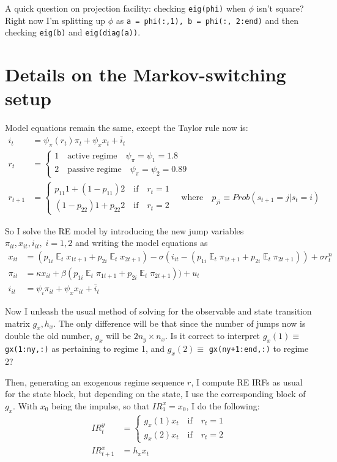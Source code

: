 \documentclass[11pt]{article}
\renewcommand{\[}{\begin{equation}}
\renewcommand{\]}{\end{equation}}
\DeclareMathOperator{\E}{\mathbb{E}}
\begin{document}
A quick question on projection facility: checking \texttt{eig(phi)} when $\phi$ isn't square? \\
Right now I'm splitting up $\phi$ as \texttt{a = phi(:,1), b = phi(:, 2:end)} and then checking \texttt{eig(b)} and \texttt{eig(diag(a))}.

\section{Details on the Markov-switching setup}
Model equations remain the same, except the Taylor rule now is:
\begin{align}
i_t & = \psi_{\pi}(r_t) \pi_t + \psi_x x_t + \bar{i}_t \\
r_t & = \begin{cases} 1 \quad \text{active regime} \quad  \psi_{\pi} = \psi_1 = 1.8  \\  2 \quad \text{passive regime} \quad  \psi_{\pi} = \psi_2= 0.89 \end{cases} \\
r_{t+1} &= \begin{cases} p_{11} 1 + (1-p_{11}) 2 \quad \text{if} \quad r_t = 1\\ (1-p_{22}) 1 + p_{22} 2 \quad \text{if} \quad r_t = 2\end{cases} \quad \text{where} \quad p_{ji}\equiv Prob(s_{t+1}=j | s_t = i)
\end{align}

So I solve the RE model by introducing the new jump variables $\pi_{it}, x_{it}, i_{it}, \; i =1,2$ and writing the model equations as
\begin{align}
x_{it} &=  (p_{1i}\E_t x_{1t+1} +p_{2i}\E_t x_{2t+1})  - \sigma(i_{it} - (p_{1i}\E_t \pi_{1t+1} +p_{2i}\E_t \pi_{2t+1})) +\sigma r_t^n   \\
\pi_{it} &= \kappa x_{it} +\beta (p_{1i}\E_t \pi_{1t+1} +p_{2i}\E_t \pi_{2t+1})) + u_t   \\
i_{it} &= \psi_{i}\pi_{it} + \psi_{x} x_{it}  + \bar{i}_t \label{TR}
\end{align}

Now I unleash the usual method of solving for the observable and state transition matrix $g_x, h_x$. The only difference will be that since the number of jumps now is double the old number, $g_x$ will be $2n_y \times n_x$. Is it correct to interpret $g_{x}(1) \equiv$ \texttt{gx(1:ny,:)} as pertaining to regime 1, and $g_{x}(2) \equiv$ \texttt{gx(ny+1:end,:)} to regime 2?

Then, generating an exogenous regime sequence $r$, I compute RE IRFs as usual for the state block, but depending on the state, I use the corresponding block of $g_x$. With $x_0$ being the impulse, so that $IR^x_1 = x_0$, I do the following:
\begin{align}
IR^y_t & = \begin{cases} g_{x}(1) x_t \quad \text{if} \quad r_t =1 \\ g_{x}(2) x_t \quad \text{if} \quad r_t =2 \end{cases} \\
IR^x_{t+1} & = h_x x_t 
\end{align}
\end{document}
